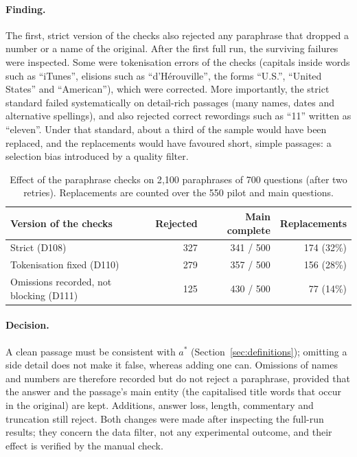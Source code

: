 \documentclass[11pt,a4paper]{report}
\begin{document}
\paragraph{Finding.}
The first, strict version of the checks also rejected any paraphrase that
dropped a number or a name of the original. After the first full run, the
surviving failures were inspected. Some were tokenisation errors of the checks
(capitals inside words such as ``iTunes'', elisions such as
``d'H\'erouville'', the forms ``U.S.'', ``United States'' and ``American''),
which were corrected. More importantly, the strict standard failed
systematically on detail-rich passages (many names, dates and alternative
spellings), and also rejected correct rewordings such as ``11'' written as
``eleven''. Under that standard, about a third of the sample would have been
replaced, and the replacements would have favoured short, simple passages:
a selection bias introduced by a quality filter.

\begin{table}[h]
\centering\small
\begin{tabular}{@{}lrrr@{}}
\toprule
Version of the checks & Rejected & Main complete & Replacements \\
\midrule
Strict (D108) & 327 & 341 / 500 & 174 (32\%) \\
Tokenisation fixed (D110) & 279 & 357 / 500 & 156 (28\%) \\
Omissions recorded, not blocking (D111) & 125 & 430 / 500 & 77 (14\%) \\
\bottomrule
\end{tabular}
\caption{Effect of the paraphrase checks on 2{,}100 paraphrases of 700
questions (after two retries). Replacements are counted over the 550 pilot and
main questions.}
\label{tab:b2-checks}
\end{table}

\paragraph{Decision.}
A clean passage must be consistent with $a^{*}$ (Section~\ref{sec:definitions});
omitting a side detail does not make it false, whereas adding one can.
Omissions of names and numbers are therefore recorded but do not reject a
paraphrase, provided that the answer and the passage's main entity (the
capitalised title words that occur in the original) are kept. Additions,
answer loss, length, commentary and truncation still reject. Both changes were
made after inspecting the full-run results; they concern the data filter, not
any experimental outcome, and their effect is verified by the manual check.
\end{document}
